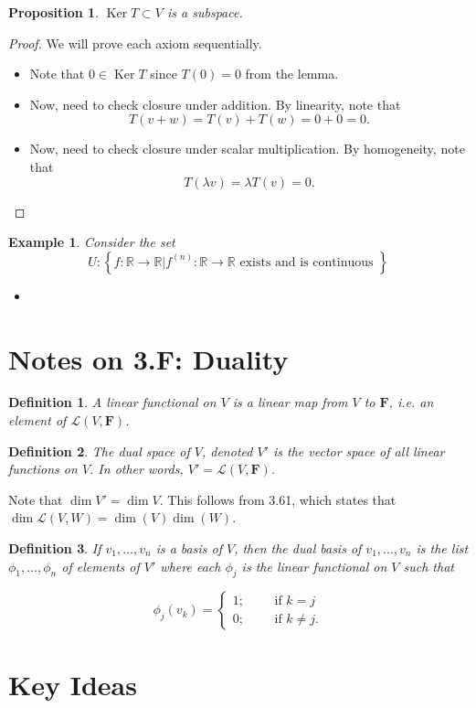 \documentclass[12pt]{article}
\newtheorem*{definition}{Definition}
\newtheorem*{example}{Example}
\newtheorem*{prop}{Proposition}
\newcommand{\RR}{\mathbb{R}}
\newcommand{\mbf}{\mathbf}
\DeclareMathOperator{\Ker}{Ker}
\begin{document}
\begin{prop}
  $\Ker T \subset V$ is a subspace.
\end{prop}

\begin{proof} We will prove each axiom sequentially.

  \begin{itemize}
    \item Note that $0 \in \Ker T$ since $T(0) = 0$ from the lemma.
    \item Now, need to check closure under addition.  By linearity, note that
      \[
        T(v+w) = T(v) + T(w) = 0 + 0 = 0.
      \]
    \item Now, need to check closure under scalar multiplication.  By homogeneity, note that
      \[
        T(\lambda v) = \lambda T(v) = 0.
      \]
  \end{itemize}
\end{proof}

\begin{example}
  Consider the set
  \[
    U: \left\{ f: \RR \to \RR | f^{(n)} : \RR \to \RR \text{ exists and is continuous }\right\}
  \]
  \begin{itemize}
    \item 
  \end{itemize}
\end{example}

\section{Notes on 3.F: Duality}

\begin{definition}
  A linear functional on $V$ is a linear map from $V$ to $\mbf{F}$, i.e. an element of $\mathcal{L}(V, \mbf{F})$. \\
\end{definition}

\begin{definition}
  The dual space of $V$, denoted $V'$ is the vector space of all linear functions on $V$.  In other words, $V' = \mathcal{L}(V, \mbf{F})$.
\end{definition}

Note that $\dim V' = \dim V$.  This follows from 3.61, which states that  $\dim \mathcal{L}(V, W) = \dim (V) \dim(W)$.

\begin{definition}
  If $v_1, \dots, v_n$ is a basis of $V$, then the dual basis of $v_1, \dots, v_n$ is the list $\phi_1, \dots, \phi_n$ of elements of $V'$ where each $\phi_j$ is the linear functional on $V$ such that

  \[
    \phi_j(v_k) =
    \begin{cases}
      1; \qquad \text{ if } k = j \\
      0; \qquad \text{ if } k \neq j.
    \end{cases}
    \]
\end{definition}

%




\section{Key Ideas}
\end{document}
